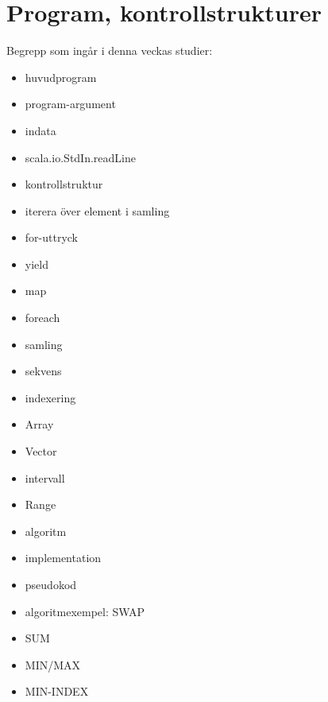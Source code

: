 \chapter{Program, kontrollstrukturer}\label{chapter:W02}
Begrepp som ingår i denna veckas studier:
\begin{itemize}[noitemsep,label={$\square$},leftmargin=*]
\item huvudprogram
\item program-argument
\item indata
\item scala.io.StdIn.readLine
\item kontrollstruktur
\item iterera över element i samling
\item for-uttryck
\item yield
\item map
\item foreach
\item samling
\item sekvens
\item indexering
\item Array
\item Vector
\item intervall
\item Range
\item algoritm
\item implementation
\item pseudokod
\item algoritmexempel: SWAP
\item SUM
\item MIN/MAX
\item MIN-INDEX\end{itemize}
